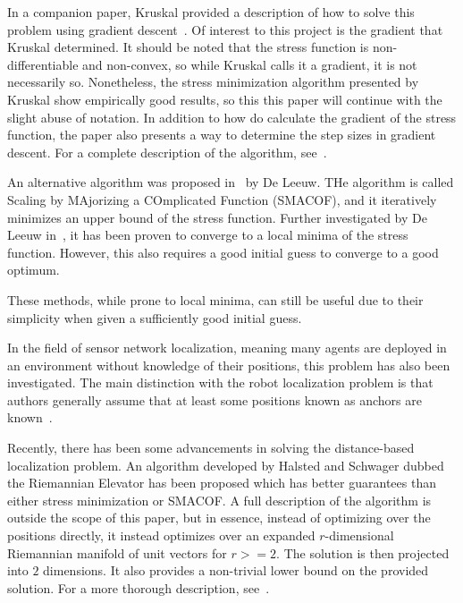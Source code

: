 In a companion paper, Kruskal provided a description of how to solve this problem using gradient descent~\cite{kruskal1964implementation}. Of interest to this project is the gradient that Kruskal determined. It should be noted that the stress function is non-differentiable and non-convex, so while Kruskal calls it a gradient, it is not necessarily so. Nonetheless, the stress minimization algorithm presented by Kruskal show empirically good results, so this this paper will continue with the slight abuse of notation. In addition to how do calculate the gradient of the stress function, the paper also presents a way to determine the step sizes in gradient descent. For a complete description of the algorithm, see~\cite{kruskal1964implementation}.

An alternative algorithm was proposed in~\cite{MDS_proposal} by De Leeuw. THe algorithm is called Scaling by MAjorizing a COmplicated Function (SMACOF), and it iteratively minimizes an upper bound of the stress function. Further investigated by De Leeuw in~\cite{SMACOF_convergence}, it has been proven to converge to a local minima of the stress function. However, this also requires a good initial guess to converge to a good optimum. 

These methods, while prone to local minima, can still be useful due to their simplicity when given a sufficiently good initial guess. 

In the field of sensor network localization, meaning many agents are deployed in an environment without knowledge of their positions, this problem has also been investigated. The main distinction with the robot localization problem is that authors generally assume that at least some positions known as anchors are known~\cite{WSN_collaborative,WSN_localization_techniques,optimization_WSN,WSN_stochastic}. 


Recently, there has been some advancements in solving the distance-based localization problem. An algorithm developed by Halsted and Schwager dubbed the Riemannian Elevator has been proposed which has better guarantees than either stress minimization or SMACOF. A full description of the algorithm is outside the scope of this paper, but in essence, instead of optimizing over the positions directly, it instead optimizes over an expanded $r$-dimensional Riemannian manifold of unit vectors for $r >= 2$. The solution is then projected into $2$ dimensions. It also provides a non-trivial lower bound on the provided solution. For a more thorough description, see~\cite{R_elevator}. 